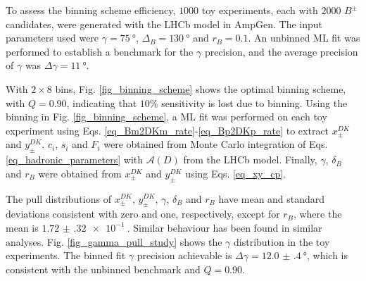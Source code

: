 \documentclass[12pt, a4paper, notitlepage, onecolumn]{article}
\begin{document}
To assess the binning scheme efficiency, $1000$ toy experiments, each with $2000$ $B^\pm$ candidates, were generated with the LHCb model in AmpGen. The input parameters used were $\gamma = \SI{75}{\degree}$, $\Delta_B = \SI{130}{\degree}$ and $r_B = 0.1$. An unbinned ML fit was performed to establish a benchmark for the $\gamma$ precision, and the average precision of $\gamma$ was $\Delta\gamma = \SI{11}{\degree}$.

With $2\times 8$ bins, Fig. \ref{fig_binning_scheme} shows the optimal binning scheme, with $Q = 0.90$, indicating that $10\%$ sensitivity is lost due to binning. Using the binning in Fig. \ref{fig_binning_scheme}, a ML fit was performed on each toy experiment using Eqs. \eqref{eq_Bm2DKm_rate}-\eqref{eq_Bp2DKp_rate} to extract $x_\pm^{DK}$ and $y_\pm^{DK}$. $c_i$, $s_i$ and $F_i$ were obtained from Monte Carlo integration of Eqs. \eqref{eq_hadronic_parameters} with $\mathcal{A}(D)$ from the LHCb model. Finally, $\gamma$, $\delta_B$ and $r_B$ were obtained from $x_\pm^{DK}$ and $y_\pm^{DK}$ using Eqs. \eqref{eq_xy_cp}.

The pull distributions of $x_\pm^{DK}$, $y_\pm^{DK}$, $\gamma$, $\delta_B$ and $r_B$ have mean and standard deviations consistent with zero and one, respectively, except for $r_B$, where the mean is $\SI{1.72(32)e-1}{}$. Similar behaviour has been found in similar analyses. Fig. \ref{fig_gamma_pull_study} shows the $\gamma$ distribution in the toy experiments. The binned fit $\gamma$ precision achievable is $\Delta\gamma = \SI{12.0(4)}{\degree}$, which is consistent with the unbinned benchmark and $Q = 0.90$.
\end{document}
